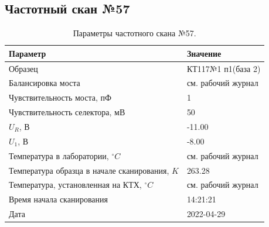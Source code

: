 \subsection{Частотный скан №57}
\begin{table}[!ht]
    \centering
    \caption{Параметры частотного скана №57.}
    \begin{tabular}{|l|l|}
        \hline
        Параметр                                       & Значение                  \\ \hline
        Образец                                        & КТ117№1 п1(база 2)        \\ \hline
        Балансировка моста                             & см. рабочий журнал        \\ \hline
        Чувствительность моста, пФ                     & 1                         \\ \hline
        Чувствительность селектора, мВ                 & 50                        \\ \hline
        $U_R$, В                                       & -11.00                    \\ \hline
        $U_1$, В                                       & -8.00                     \\ \hline
        Температура в лаборатории, $^\circ C$          & см. рабочий журнал        \\ \hline
        Температура образца в начале сканирования, $K$ & 263.28                    \\ \hline
        Температура, установленная на КТХ, $^\circ C$  & см. рабочий журнал        \\ \hline
        Время начала сканирования                      & 14:21:21                  \\ \hline
        Дата                                           & 2022-04-29                \\ \hline
    \end{tabular}
    \label{table:frequency_scan_57}
\end{table}


